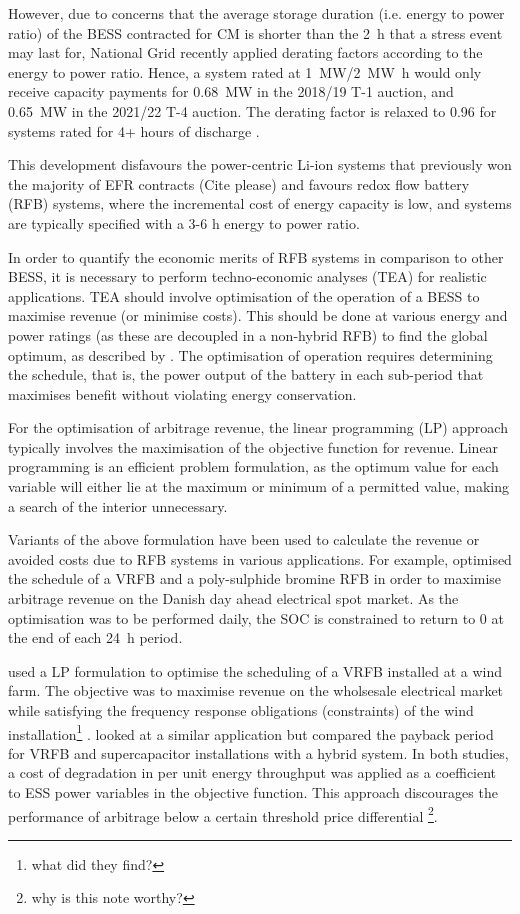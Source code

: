 \documentclass[preprint,3p,review,authoryear,10pt]{elsarticle}
\newcommand{\sol}[1]{\footnote{#1}\marginpar{\fbox{\thefootnote}}}
\begin{document}
However, due to concerns that the average storage duration (i.e. energy to power ratio) of the BESS contracted for CM is shorter than the \SI{2}{\hour} that a stress event may last for, National Grid recently applied derating factors according to the energy to power ratio. Hence, a system rated at \SI{1}{\mega\watt}/\SI{2}{\mega\watt\hour} would only receive capacity payments for \SI{0.68}{\mega\watt} in the 2018/19 T-1 auction, and \SI{0.65}{\mega\watt} in the 2021/22 T-4 auction. The derating factor is relaxed to 0.96 for systems rated for 4+ hours of discharge \cite{NGDeratingFactors}. 

This development disfavours the power-centric Li-ion systems that previously won the majority of EFR contracts (Cite please) and favours redox flow battery (RFB) systems, where the incremental cost of energy capacity is low, and systems are typically specified with a 3-6 \si{\hour} energy to power ratio. 

In order to quantify the economic merits of RFB systems in comparison to other BESS, it is necessary to perform techno-economic analyses (TEA) for realistic applications. TEA should involve optimisation of the operation of a BESS to maximise revenue (or minimise costs). This should be done at various energy and power ratings (as these are decoupled in a non-hybrid RFB) to find the global optimum, as described by \cite{Oudalov2007}. The optimisation of operation requires determining the schedule, that is, the power output of the battery in each sub-period that maximises benefit without violating energy conservation.

For the optimisation of arbitrage revenue, the linear programming (LP) approach typically involves the maximisation of the objective function for revenue. Linear programming is an efficient problem formulation, as the optimum value for each variable will either lie at the maximum or minimum of a permitted value, making a search of the interior unnecessary.

Variants of the above formulation have been used to calculate the revenue or avoided costs due to RFB systems in various applications. For example, \cite{Hu2010} optimised the schedule of a VRFB and a poly-sulphide bromine RFB in order to maximise arbitrage revenue on the Danish day ahead electrical spot market. As the optimisation was to be performed daily, the SOC is constrained to return to 0 at the end of each \SI{24}{\hour} period.

\cite{Johnston2015} used a LP formulation to optimise the scheduling of a VRFB installed at a wind farm. The objective was to maximise revenue on the wholsesale electrical market while satisfying the frequency response obligations (constraints) of the wind installation\sol{what did they find?} . \cite{Vaca2017} looked at a similar application but compared the payback period for VRFB and supercapacitor installations with a hybrid system. In both studies, a cost of degradation in \pound per unit energy throughput was applied as a coefficient to ESS power variables in the objective function. This approach discourages the performance of arbitrage below a certain threshold price differential \sol{why is this note worthy?}.
\end{document}
